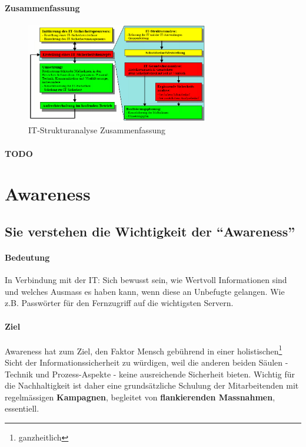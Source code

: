 \documentclass[10pt,a4paper]{article}
\begin{document}
\paragraph*{Zusammenfassung}
\begin{figure}[H]
    \begin{center}
    \includegraphics[width=8cm]{images/zusammenfassung.png}
    \caption{IT-Strukturanalyse Zusammenfassung}
    \label{IT-Strukturanalyse Zusammenfassung}
    \end{center}
\end{figure}

\paragraph*{TODO}


\section{Awareness}
\subsection*{Sie verstehen die Wichtigkeit der "`Awareness"'}
\paragraph*{Bedeutung}In Verbindung mit der IT: Sich bewusst sein, wie Wertvoll Informationen sind und welches Ausmass es haben kann, wenn diese an Unbefugte gelangen. Wie z.B. Passwörter für den Fernzugriff auf die wichtigsten Servern.

\paragraph*{Ziel}Awareness hat zum Ziel, den Faktor Mensch gebührend in einer holistischen\footnote{ganzheitlich} Sicht der Informationssicherheit zu würdigen, weil die anderen beiden Säulen - Technik und Prozess-Aspekte - keine ausreichende Sicherheit bieten. Wichtig für die Nachhaltigkeit ist daher eine grundsätzliche Schulung der Mitarbeitenden mit regelmässigen \textbf{Kampagnen}, begleitet von \textbf{flankierenden Massnahmen}, essentiell.
\end{document}

